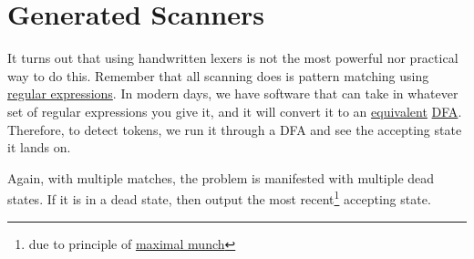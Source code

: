 \section{Generated Scanners} 

	It turns out that using handwritten lexers is not the most powerful nor practical way to do this. Remember that all scanning does is pattern matching using \hyperref[th-def:regular_expression]{regular expressions}. In modern days, we have software that can take in whatever set of regular expressions you give it, and it will convert it to an \hyperref[th-thm:regular_equivalence]{equivalent} \hyperref[th-def:dfa]{DFA}. Therefore, to detect tokens, we run it through a DFA and see the accepting state it lands on. 

  Again, with multiple matches, the problem is manifested with multiple dead states. If it is in a dead state, then output the most recent\footnote{due to principle of \hyperref[def:maximal-munch]{maximal munch}} accepting state. 

